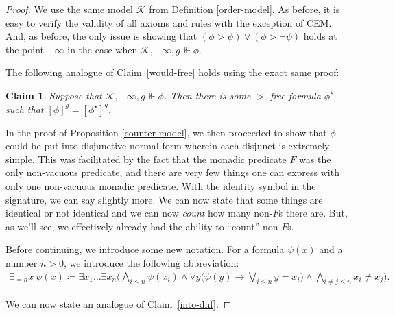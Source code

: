 \documentclass[12pt]{article}
\newtheorem{claim}{Claim}
\newcommand{\would}{\mathbin{>}}
\begin{document}

\begin{proof}
We use the same model $\mathcal{K}$ from Definition \ref{order-model}. 
As before, it is easy to verify the validity of all axioms and rules with the exception of CEM. 
And, as before, the only issue is showing that $(\phi \would \psi) \vee (\phi \would \neg\psi)$ holds at the point $-\infty$ in the case when $\mathcal{K},-\infty,g\nVdash\phi$.

The following analogue of Claim~\ref{would-free} holds using the exact same proof:

\begin{claim}\label{new-would-free}
    Suppose that $\mathcal{K},-\infty,g \nVdash \phi$. Then there is some $>$-free formula $\phi^\star$ such that $[\phi]^g=[\phi^\star]^g$.
\end{claim}

In the proof of Proposition \ref{counter-model}, we then proceeded to show that $\phi$ could be put into disjunctive normal form wherein each disjunct is extremely simple. This was facilitated by the fact that the monadic predicate $F$ was the only non-vacuous predicate, and there are very few things one can express with only one non-vacuous monadic predicate. 
With the identity symbol in the signature, we can say slightly more. 
We can now state that some things are identical or not identical and we can now \emph{count} how many non-$F$s there are. 
But, as we'll see, we effectively already had the ability to ``count'' non-$F$s.

Before continuing, we introduce some new notation. 
For a formula $\psi(x)$ and a number $n>0$, we introduce the following abbreviation:
\begin{align*}
    \exists_{=n}x \ \psi(x) \coloneqq \exists x_1\dots\exists x_n \Big( \bigwedge_{i\leq n}\psi(x_i) \wedge \forall y \big(\psi(y) \to \bigvee_{i\leq n}y=x_i\big) \wedge \bigwedge_{i\neq j \leq n} x_i\neq x_j\Big).
\end{align*}


We can now state an analogue of Claim~\ref{into-dnf}.


\end{proof}
\end{document}
